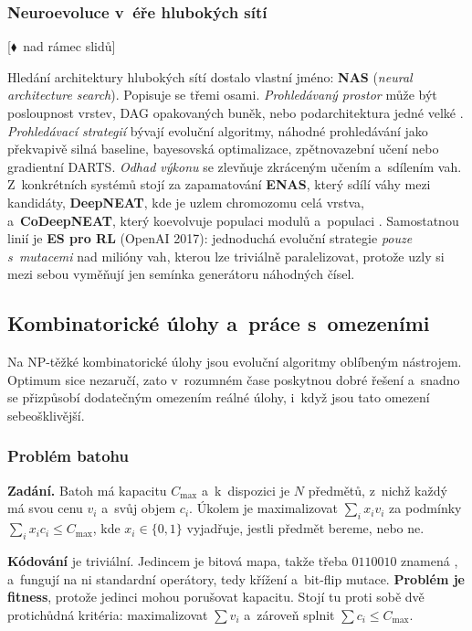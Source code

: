 \documentclass[11pt,a4paper]{article}
\theoremstyle{definition}
\newcommand{\mimo}{\textcolor{markcol}{\textsf{\footnotesize[$\blacklozenge$~nad rámec slidů]}}}
\begin{document}
\subsubsection{Neuroevoluce v~éře hlubokých sítí}

\noindent\mimo{}

Hledání architektury hlubokých sítí dostalo vlastní jméno: \textbf{NAS}
(\emph{neural architecture search}). Popisuje se třemi osami. \emph{Prohledávaný prostor}
může být posloupnost vrstev, DAG opakovaných buněk, nebo podarchitektura jedné velké
. \emph{Prohledávací strategií} bývají evoluční algoritmy, náhodné
prohledávání jako překvapivě silná baseline, bayesovská optimalizace, zpětnovazební učení
nebo gradientní DARTS. \emph{Odhad výkonu} se zlevňuje zkráceným učením a~sdílením vah.
Z~konkrétních systémů stojí za zapamatování \textbf{ENAS}, který sdílí váhy mezi kandidáty,
\textbf{DeepNEAT}, kde je uzlem chromozomu celá vrstva, a~\textbf{CoDeepNEAT}, který
koevolvuje populaci modulů a~populaci . Samostatnou linií je
\textbf{ES pro RL} (OpenAI 2017): jednoduchá evoluční strategie \emph{pouze s~mutacemi}
nad milióny vah, kterou lze triviálně paralelizovat, protože uzly si mezi sebou vyměňují
jen semínka generátoru náhodných čísel.

\subsection{Kombinatorické úlohy a~práce s~omezeními}
\label{sec:kombi}

Na NP-těžké kombinatorické úlohy jsou evoluční algoritmy oblíbeným nástrojem. Optimum sice
nezaručí, zato v~rozumném čase poskytnou dobré řešení a~snadno se přizpůsobí dodatečným
omezením reálné úlohy, i~když jsou tato omezení sebeošklivější.

\subsubsection{Problém batohu}

\textbf{Zadání.} Batoh má kapacitu $C_{\max}$ a~k~dispozici je $N$ předmětů, z~nichž každý
má svou cenu $v_i$ a~svůj objem $c_i$. Úkolem je maximalizovat $\sum_i x_i v_i$ za podmínky
$\sum_i x_i c_i \le C_{\max}$, kde $x_i \in \{0,1\}$ vyjadřuje, jestli předmět bereme, nebo
ne.

\textbf{Kódování} je triviální. Jedincem je bitová mapa, takže třeba $0110010$ znamená
, a~fungují na ni standardní operátory, tedy křížení a~bit-flip
mutace. \textbf{Problém je fitness}, protože jedinci mohou porušovat kapacitu.
Stojí tu proti sobě dvě protichůdná kritéria: maximalizovat $\sum v_i$ a~zároveň splnit
$\sum c_i \le C_{\max}$.
\end{document}
